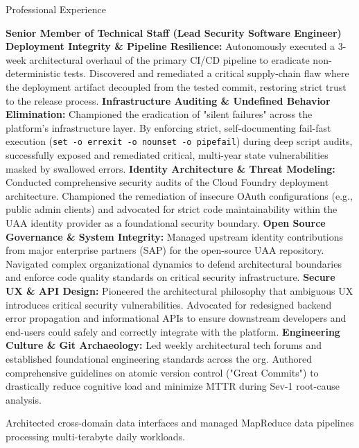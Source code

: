 \begin{rubric}{\color{ForestGreen} Professional Experience}


 \textbf{Senior Member of Technical Staff (Lead Security Software Engineer)}
 \textbf{Deployment Integrity \& Pipeline Resilience:} Autonomously executed a 3-week architectural overhaul of the primary CI/CD pipeline to eradicate non-deterministic tests. Discovered and remediated a critical supply-chain flaw where the deployment artifact decoupled from the tested commit, restoring strict trust to the release process.
\entry* \textbf{Infrastructure Auditing \& Undefined Behavior Elimination:} Championed the eradication of "silent failures" across the platform's infrastructure layer. By enforcing strict, self-documenting fail-fast execution (\texttt{set -o errexit -o nounset -o pipefail}) during deep script audits, successfully exposed and remediated critical, multi-year state vulnerabilities masked by swallowed errors.
\entry* \textbf{Identity Architecture \& Threat Modeling:} Conducted comprehensive security audits of the Cloud Foundry deployment architecture. Championed the remediation of insecure OAuth configurations (e.g., public admin clients) and advocated for strict code maintainability within the UAA identity provider as a foundational security boundary.
\entry* \textbf{Open Source Governance \& System Integrity:} Managed upstream identity contributions from major enterprise partners (SAP) for the open-source UAA repository. Navigated complex organizational dynamics to defend architectural boundaries and enforce code quality standards on critical security infrastructure.
\entry* \textbf{Secure UX \& API Design:} Pioneered the architectural philosophy that ambiguous UX introduces critical security vulnerabilities. Advocated for redesigned backend error propagation and informational APIs to ensure downstream developers and end-users could safely and correctly integrate with the platform.
\entry* \textbf{Engineering Culture \& Git Archaeology:} Led weekly architectural tech forums and established foundational engineering standards across the org. Authored comprehensive guidelines on atomic version control ("Great Commits") to drastically reduce cognitive load and minimize MTTR during Sev-1 root-cause analysis.


 Architected cross-domain data interfaces and managed MapReduce data pipelines processing multi-terabyte daily workloads.


\end{rubric}
